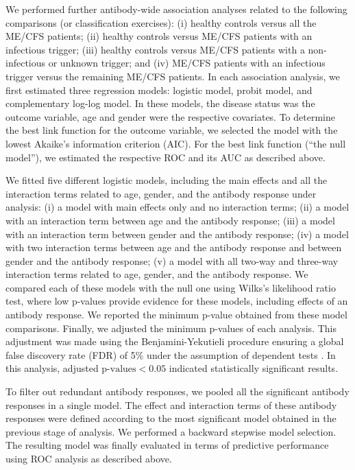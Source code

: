 We performed further antibody-wide association analyses related to the following comparisons (or classification exercises): (i) healthy controls versus all the ME/CFS patients; (ii) healthy controls versus ME/CFS patients with an infectious trigger; (iii) healthy controls versus ME/CFS patients with a non-infectious or unknown trigger; and (iv) ME/CFS patients with an infectious trigger versus the remaining ME/CFS patients. In each association analysis, we first estimated three regression models: logistic model, probit model, and complementary log-log model. In these models, the disease status was the outcome variable, age and gender were the respective covariates. To determine the best link function for the outcome variable, we selected the model with the lowest Akaike's information criterion (AIC). For the best link function (``the null model''), we estimated the respective ROC and its AUC as described above.

We fitted five different logistic models, including the main effects and all the interaction terms related to age, gender, and the antibody response under analysis: (i) a model with main effects only and no interaction terms; (ii) a model with an interaction term between age and the antibody response; (iii) a model with an interaction term between gender and the antibody response; (iv) a model with two interaction terms between age and the antibody response and between gender and the antibody response; (v) a model with all two-way and three-way interaction terms related to age, gender, and the antibody response. We compared each of these models with the null one using Wilks's likelihood ratio test, where low p-values provide evidence for these models, including effects of an antibody response. We reported the minimum p-value obtained from these model comparisons. Finally, we adjusted the minimum p-values of each analysis. This adjustment was made using the Benjamini-Yekutieli procedure ensuring a global false discovery rate (FDR) of 5\% under the assumption of dependent tests \citep{benjamini2001ControlFalse}. In this analysis, adjusted $\text{p-values} < 0.05$ indicated statistically significant results.

To filter out redundant antibody responses, we pooled all the significant antibody responses in a single model. The effect and interaction terms of these antibody responses were defined according to the most significant model obtained in the previous stage of analysis. We performed a backward stepwise model selection. The resulting model was finally evaluated in terms of predictive performance using ROC analysis as described above.

